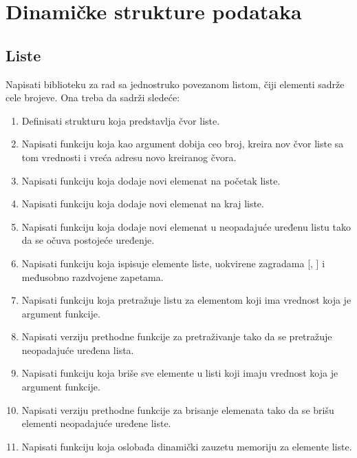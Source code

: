 
\chapter{Dinamičke strukture podataka}

\section{Liste}

\begin{Exercise}[label=601]
Napisati biblioteku za rad sa jednostruko povezanom listom, čiji elementi sadrže cele brojeve. Ona treba da sadrži sledeće:
\begin{enumerate}
\item Definisati strukturu  koja predstavlja čvor liste.
\item Napisati funkciju koja kao argument dobija ceo broj, kreira nov čvor liste sa tom vrednosti i vreća adresu novo kreiranog čvora.
 \item Napisati funkciju koja dodaje novi elemenat na početak liste. 
 \item Napisati funkciju koja dodaje novi elemenat na kraj liste. 
 \item Napisati funkciju koja dodaje novi elemenat u neopadajuće uređenu listu tako da se očuva postojeće uređenje.
 \item Napisati funkciju koja ispisuje elemente liste, uokvirene zagradama [, ] i međusobno razdvojene zapetama.
 \item Napisati funkciju koja pretražuje listu za elementom koji ima vrednost koja je argument funkcije.
 \item Napisati verziju prethodne funkcije za pretraživanje tako da se pretražuje neopadajuće uređena lista.
 \item Napisati funkciju koja briše sve elemente u listi koji imaju vrednost koja je argument funkcije.
 \item Napisati verziju prethodne funkcije za brisanje elemenata tako da se brišu elementi neopadajuće uređene liste.
 \item Napisati funkciju koja oslobađa dinamički zauzetu memoriju za elemente liste.
 \end{enumerate}


\end{Exercise}
